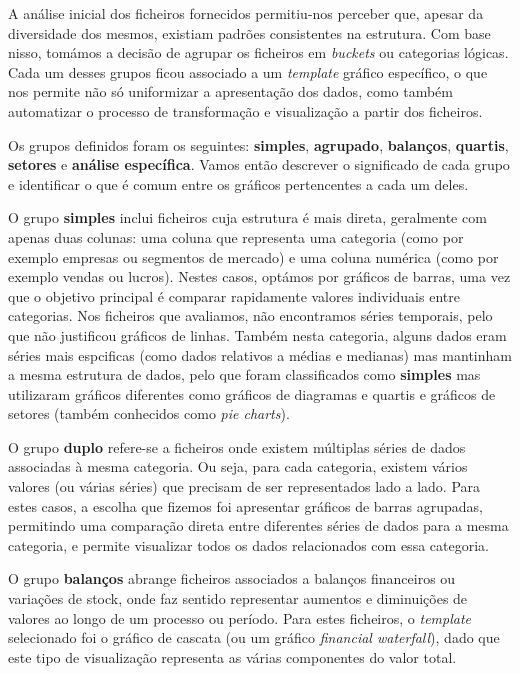 A análise inicial dos ficheiros fornecidos permitiu-nos perceber que, apesar da diversidade dos mesmos,  existiam padrões consistentes na estrutura. Com base nisso, tomámos a decisão de agrupar os ficheiros em \textit{buckets} ou categorias lógicas. Cada um desses grupos ficou associado a um \textit{template} gráfico específico, o que nos permite não só uniformizar a apresentação dos dados, como também automatizar o processo de transformação e visualização a partir dos ficheiros.

Os grupos definidos foram os seguintes: \textbf{simples}, \textbf{agrupado}, \textbf{balanços}, \textbf{quartis}, \textbf{setores} e \textbf{análise específica}. Vamos então descrever o significado de cada grupo e identificar o que é comum entre os gráficos pertencentes a cada um deles.

O grupo \textbf{simples} inclui ficheiros cuja estrutura é mais direta, geralmente com apenas duas colunas: uma coluna que representa uma categoria (como por exemplo empresas ou segmentos de mercado) e uma coluna numérica (como por exemplo vendas ou lucros). Nestes casos, optámos por gráficos de barras, uma vez que o objetivo principal é comparar rapidamente valores individuais entre categorias. Nos ficheiros que avaliamos, não encontramos séries temporais, pelo que não justificou gráficos de linhas. Também nesta categoria, alguns dados eram séries mais espcificas (como dados relativos a médias e medianas) mas mantinham a mesma estrutura de dados, pelo que foram classificados como \textbf{simples} mas utilizaram gráficos diferentes como gráficos de diagramas e quartis e gráficos de setores (também conhecidos como \textit{pie charts}).

O grupo \textbf{duplo} refere-se a ficheiros onde existem múltiplas séries de dados associadas à mesma categoria. Ou seja, para cada categoria, existem vários valores (ou várias séries) que precisam de ser representados lado a lado. Para estes casos, a escolha que fizemos foi apresentar gráficos de barras agrupadas, permitindo uma comparação direta entre diferentes séries de dados para a mesma categoria, e permite visualizar todos os dados relacionados com essa categoria.

O grupo \textbf{balanços} abrange ficheiros associados a balanços financeiros ou variações de stock, onde faz sentido representar aumentos e diminuições de valores ao longo de um processo ou período. Para estes ficheiros, o \textit{template} selecionado foi o gráfico de cascata (ou um gráfico \textit{financial waterfall}), dado que este tipo de visualização representa as várias componentes do valor total.


